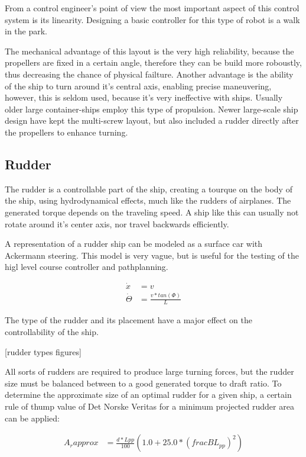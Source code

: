 From a control engineer’s point of view the most important aspect of this control system is its linearity. Designing a basic controller for this type of robot is a walk in the park.

The mechanical advantage of this layout is the very high reliability, because the propellers are fixed in a certain angle, therefore they can be build more roboustly, thus decreasing the chance of physical failture. Another advantage is the ability of the ship to turn around it’s central axis, enabling precise maneuvering, however, this is seldom used, because it’s very ineffective with ships.
Usually older large container-ships employ this type of propulsion. Newer large-scale ship design have kept the multi-screw layout, but also included a rudder directly after the propellers to enhance turning.

\subsection{Rudder}

The rudder is a controllable part of the ship, creating a tourque on the body of the ship, using hydrodynamical effects, much like the rudders of airplanes. The generated torque depends on the traveling speed. A ship like this can usually not rotate around it’s center axis, nor travel backwards efficiently.

A representation of a rudder ship can be modeled as a surface car with Ackermann steering. This model is very vague, but is useful for the testing of the higl level course controller and pathplanning.

\begin{align}
	\dot{x} &= v \\
	\dot{\Theta} &= \frac{v * tan(\Phi)}{L}
\end{align}

The type of the rudder and its placement have a major effect on the controllability of the ship.

[rudder types figures]

All sorts of rudders are required to produce large turning forces, but the rudder size must be balanced between to a good generated torque to draft ratio.
To determine the approximate size of an optimal rudder for a given ship, a certain rule of thump value of Det Norske Veritas for a minimum projected rudder area can be applied:

\begin{align}
	A_r approx&= \frac{d * Lpp}{100}(1.0 + 25.0 * (frac{B}{L_{pp}})^2)
\end{align}

